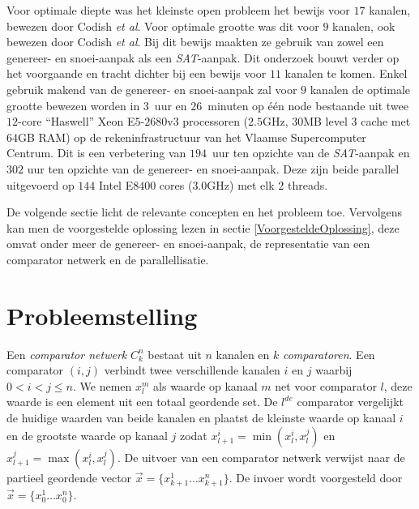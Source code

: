 \documentclass{article}
\begin{document}
Voor optimale diepte was het kleinste open probleem het bewijs voor $17$ kanalen, bewezen door Codish \textit{et al}\cite{CodishBackAgain}.
Voor optimale grootte was dit voor $9$ kanalen, ook bewezen door Codish \textit{et al}\cite{sortingNetworksSize2014}.
Bij dit bewijs maakten ze gebruik van zowel een genereer- en snoei-aanpak als een \textit{SAT}-aanpak.
Dit onderzoek bouwt verder op het voorgaande en tracht dichter bij een bewijs voor $11$ kanalen te komen.
Enkel gebruik makend van de genereer- en snoei-aanpak zal voor $9$ kanalen de optimale grootte bewezen worden in $3$~uur en $26$~minuten op \'e\'en node bestaande uit twee $12$-core ``Haswell'' Xeon E$5$-$2680$v$3$ processoren ($2.5$GHz, $30$MB level $3$ cache met $64$GB RAM) op de rekeninfrastructuur van het Vlaamse Supercomputer Centrum.
Dit is een verbetering van $194$~uur ten opzichte van de \textit{SAT}-aanpak en $302$ uur ten opzichte van de genereer- en snoei-aanpak.
Deze zijn beide parallel uitgevoerd op $144$ Intel E$8400$ cores ($3.0$GHz) met elk $2$ threads.

De volgende sectie licht de relevante concepten en het probleem toe.
Vervolgens kan men de voorgestelde oplossing lezen in sectie \ref{VoorgesteldeOplossing}, deze omvat onder meer de genereer- en snoei-aanpak, de representatie van een comparator netwerk en de parallellisatie.



\section{Probleemstelling}
Een \textit{comparator netwerk} $C^n_k$ bestaat uit $n$ kanalen en $k$ \textit{comparatoren}.
Een comparator $\left(i, j\right)$ verbindt twee verschillende kanalen $i$ en $j$ waarbij $0 < i < j \leq n$.
We nemen $x_l^m$ als waarde op kanaal $m$ net voor comparator $l$, deze waarde is een element uit een totaal geordende set. 
De $l^{de}$ comparator  vergelijkt de huidige waarden van beide kanalen en plaatst de kleinste waarde op kanaal $i$ en de grootste waarde op kanaal $j$ zodat $x_{l+1}^i = \min(x_l^i,x_l^j)$ en $x_{l+1}^j = \max(x_l^i,x_l^j)$.
De uitvoer van een comparator netwerk verwijst naar de partieel geordende vector $\vec{x} = \{x^1_{k+1} \dots x^n_{k+1} \} $.
De invoer wordt voorgesteld door $\vec{x} = \{x^1_{0} \dots x^n_{0} \} $. 
\end{document}
